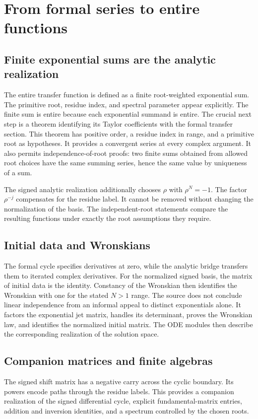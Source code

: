 \section{From formal series to entire functions}
\subsection{Finite exponential sums are the analytic realization}
The entire transfer function is defined as a finite root-weighted exponential sum.
The primitive root, residue index, and spectral parameter appear explicitly. The finite sum is entire because each exponential summand is entire. The crucial next step is a  theorem identifying its Taylor coefficients with the formal transfer section.
This theorem has positive order, a residue index in range, and a primitive root as hypotheses. It provides a convergent series at every complex argument. It also permits independence-of-root proofs: two finite sums obtained from allowed root choices have the same summing series, hence the same value by uniqueness of a sum.

The signed analytic realization additionally chooses $\rho$ with $\rho^N=-1$. The factor $\rho^{-j}$ compensates for the residue label. It cannot be removed without changing the normalization of the basis. The independent-root statements compare the resulting functions under exactly the root assumptions they require.

\subsection{Initial data and Wronskians}
The formal cycle specifies derivatives at zero, while the analytic bridge transfers them to iterated complex derivatives. For the normalized signed basis, the matrix of initial data is the identity. Constancy of the Wronskian then identifies the Wronskian with one for the stated $N>1$ range.
The source does not conclude linear independence from an informal appeal to distinct exponentials alone. It factors the exponential jet matrix, handles its determinant, proves the Wronskian law, and identifies the normalized initial matrix. The ODE modules then describe the corresponding realization of the solution space.

\subsection{Companion matrices and finite algebras}
The signed shift matrix has a negative carry across the cyclic boundary. Its powers encode paths through the residue labels. This provides a companion realization of the signed differential cycle, explicit fundamental-matrix entries, addition and inversion identities, and a spectrum controlled by the chosen roots.

